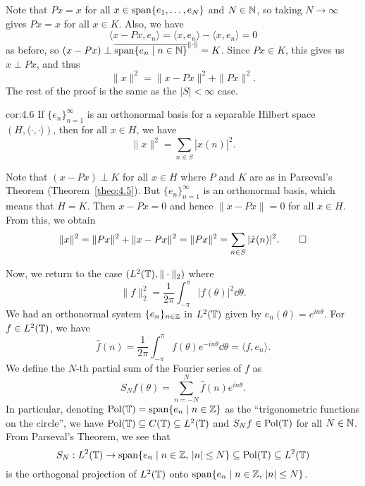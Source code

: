 \begin{pf}
    Note that $Px = x$ for all $x \in \operatorname{span}\{e_1, \dots, e_N\}$ and $N \in \mathbb{N}$, 
    so taking $N \to \infty$ gives $Px = x$ for all $x \in K$. Also, we have 
    \[ \langle x - Px, e_n \rangle = \langle x, e_n \rangle - \langle x, 
    e_n \rangle = 0 \] 
    as before, so $(x - Px) \perp \overline{\operatorname{span}\{e_n \mid n \in \mathbb{N}\}}^{\|\cdot\|} = K$. 
    Since $Px \in K$, this gives us $x \perp Px$, and thus 
    \[ \|x\|^2 = \|x - Px\|^2 + \|Px\|^2. \] 
    The rest of the proof is the same as the $|S| < \infty$ case. 
\end{pf}

\begin{cor}{cor:4.6}
    If $\{e_n\}_{n=1}^\infty$ is an orthonormal basis for a separable 
    Hilbert space $(H, \langle \cdot, \cdot \rangle)$, then for all $x \in H$, 
    we have 
    \[ \|x\|^2 = \sum_{n\in S} |\hat x(n)|^2. \] 
\end{cor}
\begin{pf}
    Note that $(x - Px) \perp K$ for all $x \in H$ where $P$ and $K$ 
    are as in Parseval's Theorem (Theorem~\ref{theo:4.5}). But 
    $\{e_n\}_{n=1}^\infty$ is an orthonormal basis, which means that 
    $H = K$. Then $x - Px = 0$ and hence $\|x - Px\| = 0$
    for all $x \in H$. From this, we obtain 
    \[ \|x\|^2 = \|Px\|^2 + \|x - Px\|^2 = \|Px\|^2 = \sum_{n\in S} |\hat x(n)|^2. 
    \qedhere \] 
\end{pf}

Now, we return to the case $(L^2(\mathbb{T}), \|\cdot\|_2)$ where 
\[ \|f\|_2^2 = \frac{1}{2\pi} \int_{-\pi}^\pi |f(\theta)|^2\dd \theta. \] 
We had an orthonormal system $\{e_n\}_{n\in\mathbb{Z}}$ in $L^2(\mathbb{T})$ given by 
$e_n(\theta) = e^{in\theta}$. For $f \in L^2(\mathbb{T})$, we have 
\[ \hat f(n) = \frac{1}{2\pi} \int_{-\pi}^\pi f(\theta) e^{-in\theta}\dd\theta 
= \langle f, e_n \rangle. \] 
We define the $N$-th partial sum of the Fourier series of $f$ as 
\[ S_N f(\theta) = \sum_{n=-N}^N \hat f(n) e^{in\theta}. \] 
In particular, denoting $\operatorname{Pol}(\mathbb{T}) = \operatorname{span}\{e_n \mid n \in \mathbb{Z}\}$ as the 
``trigonometric functions on the circle'', we have $\operatorname{Pol}(\mathbb{T}) 
\subseteq C(\mathbb{T}) \subseteq L^2(\mathbb{T})$ and $S_Nf \in \operatorname{Pol}(\mathbb{T})$ for all 
$N \in \mathbb{N}$. From Parseval's Theorem, we see that 
\[ S_N : L^2(\mathbb{T}) \to \operatorname{span}\{e_n \mid n \in \mathbb{Z},\, |n| \leq N\} \subseteq 
\operatorname{Pol}(\mathbb{T}) \subseteq L^2(\mathbb{T}) \] 
is the orthogonal projection of $L^2(\mathbb{T})$ onto $\operatorname{span}\{e_n \mid n \in \mathbb{Z},\, 
|n| \leq N\}$.

